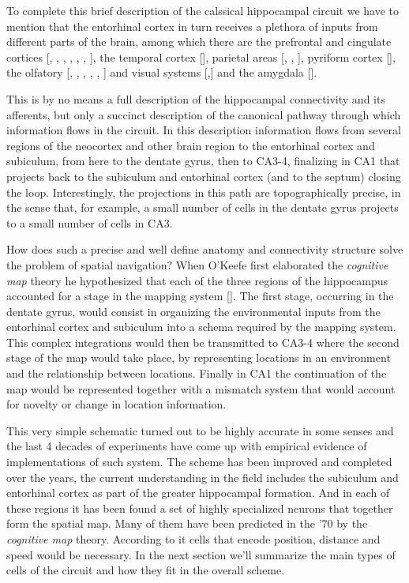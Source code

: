 To complete this brief description of the calssical hippocampal circuit we have to mention that the entorhinal cortex in turn receives a plethora of inputs from different parts of the brain, among which there are the prefrontal and cingulate cortices [\cite{adey1951}, \cite{adeymeyer1952}, \cite{white1959}, \cite{cragg1965}, \cite{raisman1965}, \cite{mclardy1971}, \cite{leichnetz1975}], the temporal cortex [\cite{cragg1965}], parietal areas [\cite{pandya1969}, \cite{pandyavignolo1969}, \cite{petras1971}], pyriform cortex [\cite{powell1965}], the olfatory [\cite{cragg1960}, \cite{cragg1961}, \cite{heimer1968}, \cite{white1965}, \cite{price1971}, \cite{kerr1972}] and visual systems [\cite{casey1965},\cite{cuenod1965}] and the amygdala [\cite{krettek1974}].

This is by no means a full description of the hippocampal connectivity and its afferents, but only a succinct description of the canonical pathway through which information flows in the circuit. 
In this description information flows from several regions of the neocortex and other brain region to the entorhinal cortex and subiculum, from here to the dentate gyrus, then to CA3-4, finalizing in CA1 that projects back to the subiculum and entorhinal cortex (and to the septum) closing the loop. 
Interestingly, the projections in this path are topographically precise, in the sense that, for example, a small number of cells in the dentate gyrus projects to a small number of cells in CA3.

How does such a precise and well define anatomy and connectivity structure solve the problem of spatial navigation? 
When O'Keefe first elaborated the \textit{cognitive map} theory he hypothesized that each of the three regions of the hippocampus accounted for a stage in the mapping system [\cite{okeefebook}].
The first stage, occurring in the dentate gyrus, would consist in organizing the environmental inputs from the entorhinal cortex and subiculum into a schema required by the mapping system. 
This complex integrations would then be transmitted to CA3-4 where the second stage of the map would take place, by representing locations in an environment and the relationship between locations.
Finally in CA1 the continuation of the map would be represented together with a mismatch system that would account for novelty or change in location information.

This very simple schematic turned out to be highly accurate in some senses and the last 4 decades of experiments have come up with empirical evidence of implementations of such system. 
The scheme has been improved and completed over the years, the current understanding in the field includes the subiculum and entorhinal cortex as part of the greater hippocampal formation.
And in each of these regions it has been found a set of highly specialized neurons that together form the spatial map. 
Many of them have been predicted in the '70 by the \textit{cognitive map} theory. 
According to it cells that encode position, distance and speed would be necessary.
In the next section we'll summarize the main types of cells of the circuit and how they fit in the overall scheme. 

